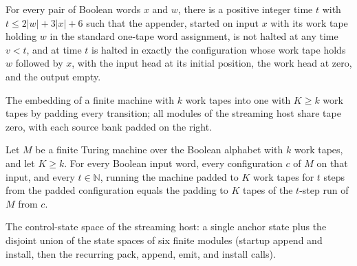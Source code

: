\begin{lemma}
\label{Complexity.satAppend_clean}
\leanok
{}
For every pair of Boolean words $x$ and $w$, there is a positive integer time $t$ with
$t \le 2|w|+3|x|+6$ such that the appender, started on input $x$ with its work tape
holding $w$ in the standard one-tape word assignment, is not halted at any time $v<t$,
and at time $t$ is halted in exactly the configuration whose work tape holds $w$
followed by $x$, with the input head at its initial position, the work head at zero, and
the output empty.
\end{lemma}

\begin{definition}
\label{Complexity.satPadTM}
\leanok
{}
The embedding of a finite machine with $k$ work tapes into one with $K \ge k$
work tapes by padding every transition; all modules of the streaming host share
tape zero, with each source bank padded on the right.
\end{definition}

\begin{lemma}
\label{Complexity.satPad_run}
\leanok
{}
Let $M$ be a finite Turing machine over the Boolean alphabet with $k$ work tapes, and
let $K\ge k$. For every Boolean input word, every configuration $c$ of $M$ on that
input, and every $t\in\mathbb{N}$, running the machine padded to $K$ work tapes for $t$
steps from the padded configuration equals the padding to $K$ tapes of the $t$-step run
of $M$ from $c$.
\end{lemma}

\begin{definition}
\label{Complexity.SatHostState}
\leanok
{}
The control-state space of the streaming host: a single anchor state plus the
disjoint union of the state spaces of six finite modules (startup append and
install, then the recurring pack, append, emit, and install calls).
\end{definition}

